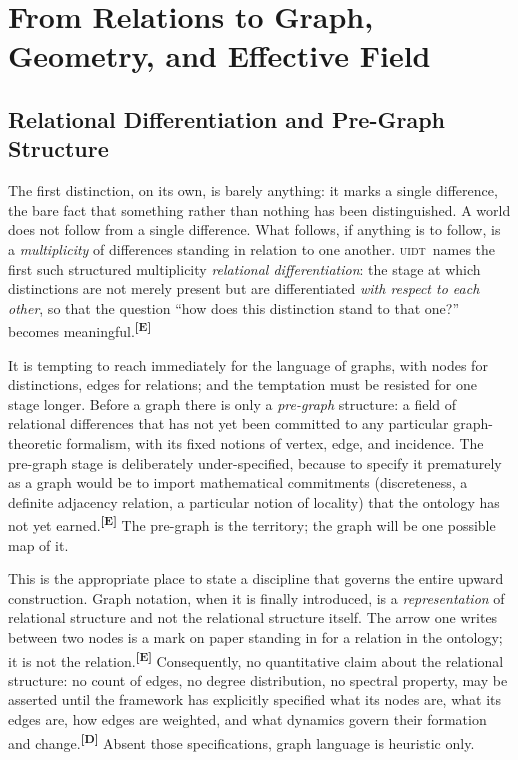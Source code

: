 \documentclass[12pt,a4paper,twoside]{article}
\theoremstyle{plain}
\theoremstyle{definition}
\theoremstyle{remark}
\newcommand{\UIDT}{\textsc{uidt}}
\newcommand{\catmark}[1]{\textsuperscript{\textsf{\textbf{[#1]}}}}
\begin{document}
\newpage
\section{From Relations to Graph, Geometry, and Effective Field}
\label{sec:relations-to-field}

\subsection{Relational Differentiation and Pre-Graph Structure}
\label{subsec:relational-differentiation}

The first distinction, on its own, is barely anything: it marks a single difference, the bare fact that something rather than nothing has been distinguished. A world does not follow from a single difference. What follows, if anything is to follow, is a \emph{multiplicity} of differences standing in relation to one another. \UIDT\ names the first such structured multiplicity \emph{relational differentiation}: the stage at which distinctions are not merely present but are differentiated \emph{with respect to each other}, so that the question ``how does this distinction stand to that one?'' becomes meaningful.\catmark{E}

It is tempting to reach immediately for the language of graphs, with nodes for distinctions, edges for relations; and the temptation must be resisted for one stage longer. Before a graph there is only a \emph{pre-graph} structure: a field of relational differences that has not yet been committed to any particular graph-theoretic formalism, with its fixed notions of vertex, edge, and incidence. The pre-graph stage is deliberately under-specified, because to specify it prematurely as a graph would be to import mathematical commitments (discreteness, a definite adjacency relation, a particular notion of locality) that the ontology has not yet earned.\catmark{E} The pre-graph is the territory; the graph will be one possible map of it.

This is the appropriate place to state a discipline that governs the entire upward construction. Graph notation, when it is finally introduced, is a \emph{representation} of relational structure and not the relational structure itself. The arrow one writes between two nodes is a mark on paper standing in for a relation in the ontology; it is not the relation.\catmark{E} Consequently, no quantitative claim about the relational structure: no count of edges, no degree distribution, no spectral property, may be asserted until the framework has explicitly specified what its nodes are, what its edges are, how edges are weighted, and what dynamics govern their formation and change.\catmark{D} Absent those specifications, graph language is heuristic only.
\end{document}
